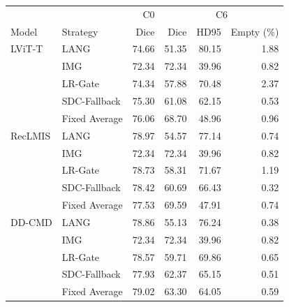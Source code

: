 \begin{tabular}{llrrrr}
\hline
 & & C0 & \multicolumn{3}{c}{C6} \\
Model & Strategy & Dice & Dice & HD95 & Empty (\%) \\
\hline
LViT-T & LANG & 74.66 & 51.35 & 80.15 & 1.88 \\
 & IMG & 72.34 & 72.34 & 39.96 & 0.82 \\
 & LR-Gate & 74.34 & 57.88 & 70.48 & 2.37 \\
 & SDC-Fallback & 75.30 & 61.08 & 62.15 & 0.53 \\
 & Fixed Average & 76.06 & 68.70 & 48.96 & 0.96 \\
\hline
RecLMIS & LANG & 78.97 & 54.57 & 77.14 & 0.74 \\
 & IMG & 72.34 & 72.34 & 39.96 & 0.82 \\
 & LR-Gate & 78.73 & 58.31 & 71.67 & 1.19 \\
 & SDC-Fallback & 78.42 & 60.69 & 66.43 & 0.32 \\
 & Fixed Average & 77.53 & 69.59 & 47.91 & 0.74 \\
\hline
DD-CMD & LANG & 78.86 & 55.13 & 76.24 & 0.38 \\
 & IMG & 72.34 & 72.34 & 39.96 & 0.82 \\
 & LR-Gate & 78.57 & 59.71 & 69.86 & 0.65 \\
 & SDC-Fallback & 77.93 & 62.37 & 65.15 & 0.51 \\
 & Fixed Average & 79.02 & 63.30 & 64.05 & 0.59 \\
\hline
\end{tabular}
